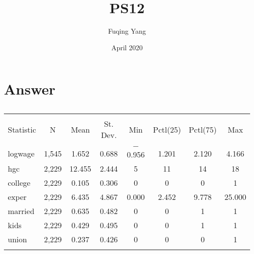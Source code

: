 \documentclass{article}
\title{PS12}
\author{Fuqing Yang }
\date{April 2020}
\begin{document}
\maketitle

\section{Answer}


\begin{table}[!htbp] \centering 
  \caption{} 
  \label{} 
\begin{tabular}{@{\extracolsep{5pt}}lccccccc} 
\\[-1.8ex]\hline 
\hline \\[-1.8ex] 
Statistic & \multicolumn{1}{c}{N} & \multicolumn{1}{c}{Mean} & \multicolumn{1}{c}{St. Dev.} & \multicolumn{1}{c}{Min} & \multicolumn{1}{c}{Pctl(25)} & \multicolumn{1}{c}{Pctl(75)} & \multicolumn{1}{c}{Max} \\ 
\hline \\[-1.8ex] 
logwage & 1,545 & 1.652 & 0.688 & $-$0.956 & 1.201 & 2.120 & 4.166 \\ 
hgc & 2,229 & 12.455 & 2.444 & 5 & 11 & 14 & 18 \\ 
college & 2,229 & 0.105 & 0.306 & 0 & 0 & 0 & 1 \\ 
exper & 2,229 & 6.435 & 4.867 & 0.000 & 2.452 & 9.778 & 25.000 \\ 
married & 2,229 & 0.635 & 0.482 & 0 & 0 & 1 & 1 \\ 
kids & 2,229 & 0.429 & 0.495 & 0 & 0 & 1 & 1 \\ 
union & 2,229 & 0.237 & 0.426 & 0 & 0 & 0 & 1 \\ 
\hline \\[-1.8ex] 
\end{tabular} 
\end{table} 
\end{document}

